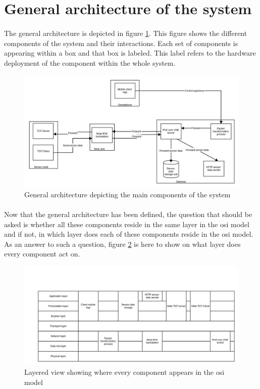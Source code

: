 \documentclass[oneside,12pt,a4paper,final]{book}
\begin{document}
\section{General architecture of the system}
\paragraph{}
The general architecture is depicted in figure \ref{fig:gen_architecture}. This figure shows the different components of the system and their interactions. Each set of components is appearing within a box and that box is labeled. This label refers to the hardware deployment of the component within the whole system.
\begin{figure}[htbp]
\centering
\includegraphics[scale=0.40]{img/general_architecture.jpg}
\caption{General architecture depicting the main components of the system}
\label{fig:gen_architecture}
\end{figure}
\paragraph{}
Now that the general architecture has been defined, the question that should be asked is whether all these components reside in the same layer in the \gls{osi} model and if not, in which layer does each of these components reside in the \gls{osi} model. As an answer to such a question, figure \ref{fig:layered_view} is here to show on what layer does every component act on.

\begin{figure}[htbp]
\centering
\includegraphics[scale=0.40]{img/layered_view.jpg}
\caption{Layered view showing where every component appears in the \gls{osi} model}
\label{fig:layered_view}
\end{figure}
\end{document}
